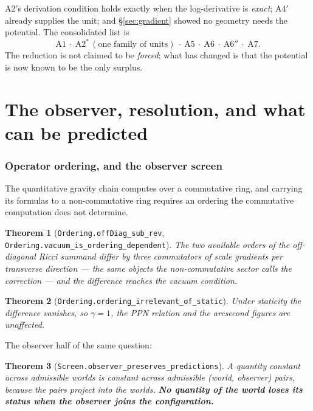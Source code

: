 \documentclass[11pt,a4paper]{article}
\newtheorem{theorem}{Theorem}[section]
\theoremstyle{definition}
\theoremstyle{remark}
\newcommand{\lean}[1]{\texttt{\small #1}}
\newcommand{\App}{\ensuremath{\mathrm{A6}''}}
\newcommand{\Afour}{\ensuremath{\mathrm{A4}'}}
\begin{document}
A2's derivation condition holds exactly when the log-derivative is \emph{exact};
\Afour{} already supplies the unit; and \S\ref{sec:gradient} showed no geometry
needs the potential. The consolidated list is
\[
  \mathrm{A1}\ \cdot\ \mathrm{A2}^{*}\,(\text{one family of units})\ \cdot\
  \mathrm{A5}\ \cdot\ \mathrm{A6}\ \cdot\ \App\ \cdot\ \mathrm{A7}.
\]
The reduction is not claimed to be \emph{forced}; what has changed is that the
potential is now known to be the only surplus.

\part{The observer, resolution, and what can be predicted}

\section{Operator ordering, and the observer screen}
\label{sec:ordering}

The quantitative gravity chain computes over a commutative ring, and carrying its
formulas to a non-commutative ring requires an ordering the commutative
computation does not determine.

\begin{theorem}[\lean{Ordering.offDiag\_sub\_rev},
\lean{Ordering.vacuum\_is\_ordering\_dependent}]
The two available orders of the off-diagonal Ricci summand differ by three
commutators of scale gradients per transverse direction --- the same objects the
non-commutative sector calls the correction --- and the difference reaches the
vacuum condition.
\end{theorem}

\begin{theorem}[\lean{Ordering.ordering\_irrelevant\_of\_static}]
Under staticity the difference vanishes, so $\gamma=1$, the PPN relation and the
arcsecond figures are unaffected.
\end{theorem}

The observer half of the same question:

\begin{theorem}[\lean{Screen.observer\_preserves\_predictions}]
A quantity constant across admissible worlds is constant across admissible
(world, observer) pairs, because the pairs project into the worlds. \textbf{No
quantity of the world loses its status when the observer joins the
configuration.}
\end{theorem}
\end{document}
